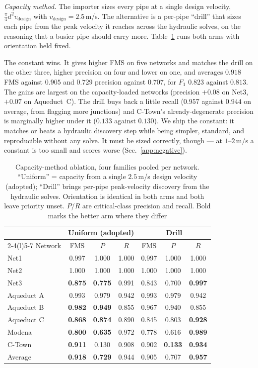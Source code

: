 \documentclass[11pt]{article}
\begin{document}
\emph{Capacity method.} The importer sizes every pipe at a single design
velocity, $\tfrac{\pi}{4}d^2 v_{\text{design}}$ with $v_{\text{design}}=2.5$\,m/s. The
alternative is a per-pipe ``drill'' that sizes each pipe from the peak velocity it
reaches across the hydraulic solves, on the reasoning that a busier pipe should carry
more. Table~\ref{tab:capmethod} runs both arms with orientation held fixed.

The constant wins. It gives higher FMS on five networks and matches the drill on the
other three, higher precision on four and lower on one, and averages $0.918$ FMS against
$0.905$ and $0.729$ precision against $0.707$, for $F_1$ $0.823$ against $0.813$. The gains are largest on
the capacity-loaded networks (precision $+0.08$ on Net3, $+0.07$ on Aqueduct~C). The
drill buys back a little recall ($0.957$ against $0.944$ on average, from flagging more
junctions) and C-Town's already-degenerate precision is marginally higher under it
($0.133$ against $0.130$). We ship the constant: it matches or beats a hydraulic
discovery step while being simpler, standard, and reproducible without any solve. It
must be sized correctly, though --- at $1$--$2$\,m/s a constant is too small and scores
worse (Sec.~\ref{app:negative}).

\begin{table}[t]
\centering
\caption{Capacity-method ablation, four families pooled per network. ``Uniform'' =
capacity from a single $2.5$\,m/s design velocity (adopted); ``Drill'' brings per-pipe
peak-velocity discovery from the hydraulic solves. Orientation is identical in both
arms and both leave priority unset. $P$/$R$ are critical-class precision and recall.
Bold marks the better arm where they differ}\label{tab:capmethod}
\small
\begin{tabular}{lccc@{\hskip 1.5em}ccc}
\toprule
 & \multicolumn{3}{c}{Uniform (adopted)} & \multicolumn{3}{c}{Drill} \\
\cmidrule(r){2-4}\cmidrule(l){5-7}
Network & FMS & $P$ & $R$ & FMS & $P$ & $R$ \\
\midrule
Net1       & 0.997 & 1.000 & 1.000 & 0.997 & 1.000 & 1.000 \\
Net2       & 1.000 & 1.000 & 1.000 & 1.000 & 1.000 & 1.000 \\
Net3       & \textbf{0.875} & \textbf{0.775} & 0.991 & 0.843 & 0.700 & \textbf{0.997} \\
Aqueduct A & 0.993 & 0.979 & 0.942 & 0.993 & 0.979 & 0.942 \\
Aqueduct B & \textbf{0.982} & \textbf{0.949} & 0.855 & 0.967 & 0.940 & 0.855 \\
Aqueduct C & \textbf{0.868} & \textbf{0.874} & 0.890 & 0.845 & 0.803 & \textbf{0.928} \\
Modena     & \textbf{0.800} & \textbf{0.635} & 0.972 & 0.778 & 0.616 & \textbf{0.989} \\
C-Town     & \textbf{0.911} & 0.130 & 0.908 & 0.902 & \textbf{0.133} & \textbf{0.934} \\
\midrule
Average    & \textbf{0.918} & \textbf{0.729} & 0.944 & 0.905 & 0.707 & \textbf{0.957} \\
\bottomrule
\end{tabular}
\end{table}
\end{document}
